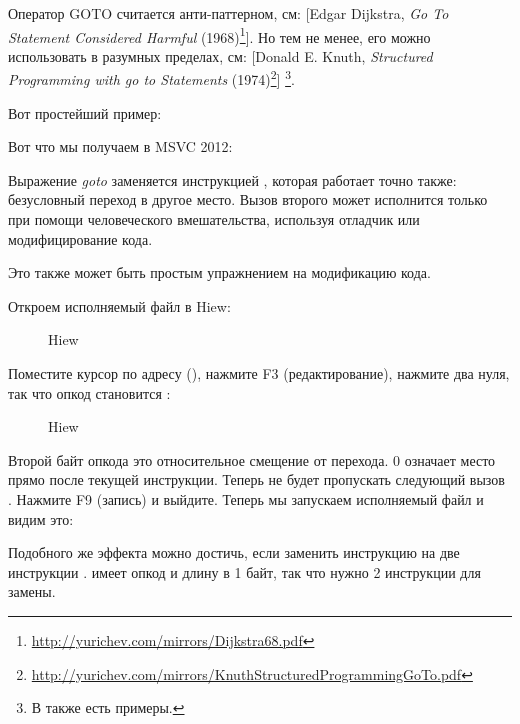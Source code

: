 
Оператор GOTO считается анти-паттерном, см:
[Edgar Dijkstra, \emph{Go To Statement Considered Harmful} (1968)\footnote{\url{http://yurichev.com/mirrors/Dijkstra68.pdf}}].
Но тем не менее, его можно использовать в разумных пределах, см:
[Donald E. Knuth, \emph{Structured Programming with go to Statements} (1974)\footnote{\url{http://yurichev.com/mirrors/KnuthStructuredProgrammingGoTo.pdf}}]
\footnote{В \InSqBrackets{\CNotes} также есть примеры.}.

Вот простейший пример:



Вот что мы получаем в MSVC 2012:



Выражение \emph{goto} заменяется инструкцией \JMP, которая работает точно также: безусловный переход в другое место.
Вызов второго \printf может исполнится только при помощи человеческого вмешательства, используя отладчик или модифицирование кода.

\par

\clearpage
Это также может быть простым упражнением на модификацию кода.

Откроем исполняемый файл в Hiew:

\begin{figure}[H]
\centering
{}
\caption{Hiew}
\label{fig:goto_hiew1}
\end{figure}

\clearpage
Поместите курсор по адресу \JMP (), 
нажмите F3 (редактирование), нажмите два нуля, так что
опкод становится :

\begin{figure}[H]
\centering
{}
\caption{Hiew}
\label{fig:goto_hiew2}
\end{figure}

Второй байт опкода \JMP это относительное смещение от перехода. 0 означает место
прямо после текущей инструкции.
Теперь \JMP не будет пропускать следующий вызов \printf.
Нажмите F9 (запись) и выйдите.
Теперь мы запускаем исполняемый файл и видим это:



Подобного же эффекта можно достичь, если заменить инструкцию \JMP на две инструкции \NOP.
\NOP имеет опкод  и длину в 1 байт, так что нужно 2 инструкции для замены.

